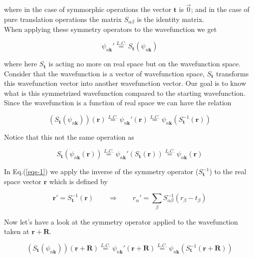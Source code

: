 \documentclass[a4paper,12pt]{report}
\begin{document}
where in the case of symmorphic operations the vector $\mathbf{t}$ is $\overrightarrow{0}$; and in the case of pure translation operations the matrix $S_{\alpha\beta}$ is the identity matrix.\\
When applying these symmetry operators to the wavefunction we get

\begin{equation}
\psi_{n\mathbf{k}}' \stackrel{L.C.}{=} S_{\mathbf{t}} \left( \psi_{n\mathbf{k}}\right)
\end{equation}

where here $S_{\mathbf{t}}$ is acting no more on real space but on the wavefunction space. Consider that the wavefunction is a vector of wavefunction space, $S_{\mathbf{t}}$ transforms this wavefunction vector into another wavefunction vector. Our goal is to know what is this symmetrized wavefunction compared to the starting wavefunction. Since the wavefunction is a function of real space we can have the relation

\begin{equation}
\left(S_{\mathbf{t}} \left( \psi_{n\mathbf{k}}\right) \right)(\mathbf{r}) \stackrel{L.C.}{=} \psi_{n\mathbf{k}}' (\mathbf{r}) \stackrel{L.C.}{=} \psi_{n\mathbf{k}}(S_{\mathbf{t}}^{-1}\left( \mathbf{r}\right) ) \label{eqs-1}
\end{equation}

Notice that this not the same operation as

\begin{equation}
S_{\mathbf{t}} \left( \psi_{n\mathbf{k}}(\mathbf{r})\right) \stackrel{L.C.}{=} \psi_{n\mathbf{k}}' (S_{\mathbf{t}}(\mathbf{r})) \stackrel{L.C.}{=} \psi_{n\mathbf{k}}( \mathbf{r})
\end{equation}

In Eq.(\ref{eqs-1}) we apply the inverse of the symmetry operator ($S_{\mathbf{t}}^{-1}$) to the real space vector $\mathbf{r}$ which is defined by

\begin{equation}
\mathbf{r}' = S_{\mathbf{t}}^{-1}\left( \mathbf{r}\right)  \qquad \Rightarrow  \qquad r_{\alpha}' = \sum_{\beta} S_{\alpha \beta}^{-1}\left( r_{\beta} - t_{\beta}\right)
\end{equation}

Now let's have a look at the symmetry operator applied to the wavefunction taken at $\mathbf{r}+\mathbf{R}$.

\begin{equation}
\left( S_{\mathbf{t}} \left( \psi_{n\mathbf{k}}\right) \right) (\mathbf{r}+\mathbf{R}) \stackrel{L.C.}{=} \psi_{n\mathbf{k}}'(\mathbf{r}+\mathbf{R}) \stackrel{L.C.}{=} \psi_{n\mathbf{k}}(S_{\mathbf{t}}^{-1}\left( \mathbf{r}+\mathbf{R}\right) ) \label{eqA}
\end{equation}
\end{document}
